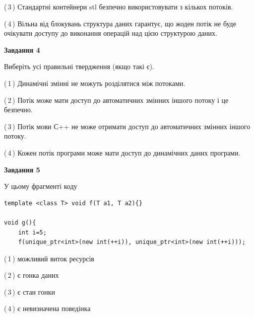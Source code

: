 \documentclass[12pt, ukrainian]{article}
\begin{document}
\begin {large}
{(\,3\,) Стандартні контейнери stl безпечно використовувати з кількох потоків.%

(\,4\,) Вільна від блокувань структура даних гарантує, що жоден потік не буде очікувати доступу до виконання операцій над цією структурою даних.%



\begin{center}
\textbf{Завдання 4}
\end{center}
Виберіть усі правильні твердження (якщо такі є).\par
\vspace{2mm}

(\,1\,) Динамічні змінні не можуть розділятися між потоками.%

(\,2\,) Потік може мати доступ до автоматичних змінних іншого потоку і це безпечно.%

(\,3\,) Потік мови С++ не може отримати доступ до автоматичних змінних іншого потоку.%

(\,4\,) Кожен потік програми може мати доступ до динамічних даних програми.%



\begin{center}
\textbf{Завдання 5}
\end{center}
У цьому фрагменті коду
\begin{verbatim}
template <class T> void f(T a1, T a2){}

void g(){
    int i=5;
    f(unique_ptr<int>(new int(++i)), unique_ptr<int>(new int(++i)));
\end{verbatim}

(\,1\,) можливий виток ресурсів%

(\,2\,) є гонка даних%

(\,3\,) є стан гонки%

(\,4\,) є невизначена поведінка%


}
\end {large}
\end{document}
